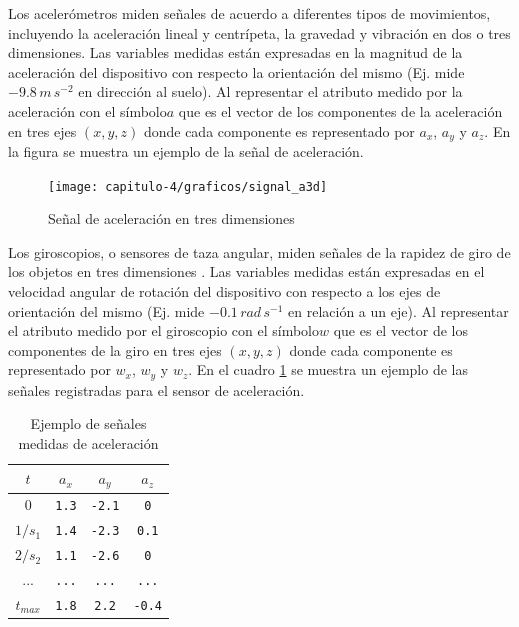 Los acelerómetros miden señales de acuerdo a diferentes tipos de movimientos,
incluyendo la aceleración lineal y centrípeta, la gravedad y vibración
\cite{Goehl2007} en dos o tres dimensiones. Las variables medidas
están expresadas en la magnitud de la aceleración del dispositivo
con respecto la orientación del mismo (Ej. mide $-9.8\,m\,s^{-2}$
en dirección al suelo). Al representar el atributo medido por la aceleración
con el símbolo$a$ que es el vector de los componentes de la aceleración
en tres ejes $(x,y,z)$ donde cada componente es representado por
$a_{x}$, $a_{y}$ y $a_{z}$. En la figura 
se muestra un ejemplo de la señal de aceleración.

\begin{figure}[!tbph]
\begin{centering}
\texttt{[image: capitulo-4/graficos/signal\_a3d]}
\par\end{centering}
\caption{\label{fig421:muestra-ac}Señal de aceleración en tres dimensiones}
\end{figure}

Los giroscopios, o sensores de taza angular, miden señales de la rapidez
de giro de los objetos en tres dimensiones \cite{Goehl2007}. Las
variables medidas están expresadas en el velocidad angular de rotación
del dispositivo con respecto a los ejes de orientación del mismo (Ej.
mide \foreignlanguage{english}{$-0.1\,rad\,s^{-1}$} en relación a
un eje). Al representar el atributo medido por el giroscopio con el
símbolo$w$ que es el vector de los componentes de la giro en tres
ejes $(x,y,z)$ donde cada componente es representado por $w_{x}$,
$w_{y}$ y $w_{z}$. En el cuadro \ref{fig421:muestra-ac} se muestra
un ejemplo de las señales registradas para el sensor de aceleración.

\begin{table}[!tbph]
\begin{centering}
\begin{tabular}{|c|c|c|c|}
\hline 
$t$ & $a_{x}$ & $a_{y}$ & $a_{z}$\tabularnewline
\hline 
\hline 
$0$ & \texttt{1.3} & \texttt{-2.1} & \texttt{0}\tabularnewline
\hline 
$1/s_{1}$ & \texttt{1.4} & \texttt{-2.3} & \texttt{0.1}\tabularnewline
\hline 
$2/s_{2}$ & \texttt{1.1} & \texttt{-2.6} & \texttt{0}\tabularnewline
\hline 
... & \texttt{...} & \texttt{...} & \texttt{...}\tabularnewline
\hline 
$t_{max}$ & \texttt{1.8} & \texttt{2.2} & \texttt{-0.4}\tabularnewline
\hline 
\end{tabular}
\par\end{centering}
\caption{\label{tab421:ex-se=0000F1ales}Ejemplo de señales medidas de aceleración}
\end{table}


